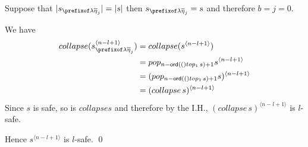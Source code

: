 \documentclass[a4paper]{article}
\theoremstyle{remark}
\theoremstyle{definition}
\begin{document}
Suppose that $|s_{\prefixof \lambda\overline\eta_j}|=|s|$ then $s_{\prefixof \lambda\overline\eta_j}=s$ and therefore $b=j=0$.

We have 
\begin{align*}
  collapse(s_{\prefixof \lambda\overline\eta_j}^{\langle n-l+1\rangle})
  &= collapse(s^{\langle n-l+1\rangle}) \\
  &= pop_{n-\ord(top_1\, s)+1} s^{\langle n-l+1\rangle} \\
  &= (pop_{n-\ord(top_1\, s)+1} s)^{\langle n-l+1\rangle} \\
  &= (collapse\, s)^{\langle n-l+1\rangle}
\end{align*}
Since $s$ is safe, so is $collapse s$ and therefore by the I.H.,
$(collapse\, s)^{\langle n-l+1\rangle}$ is $l$-safe.

Hence $s^{\langle n-l+1 \rangle}$ is $l$-safe. \qed
\smallskip
\end{document}
